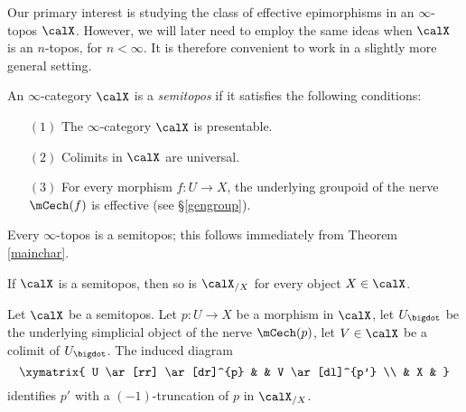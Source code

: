 Our primary interest is studying the class of effective epimorphisms in an $\infty$-topos $\calX$.
However, we will later need to employ the same ideas when $\calX$ is an $n$-topos, for $n < \infty$. It is therefore convenient to work in a slightly more general setting.

\begin{definition}
An $\infty$-category $\calX$ is a {\it semitopos} if it satisfies the following conditions:
\begin{itemize}
\item[$(1)$] The $\infty$-category $\calX$ is presentable.
\item[$(2)$] Colimits in $\calX$ are universal.
\item[$(3)$] For every morphism $f: U \rightarrow X$, the underlying groupoid
of the \Cech nerve $\mCech(f)$ is effective (see \S \ref{gengroup}). 
\end{itemize}
\end{definition}

\begin{remark}
Every $\infty$-topos is a semitopos; this follows immediately from Theorem \ref{mainchar}.
\end{remark}

\begin{remark}
If $\calX$ is a semitopos, then so is $\calX_{/X}$ for every object $X \in \calX$.
\end{remark}

\begin{proposition}\label{slurpme}
Let $\calX$ be a semitopos. Let $p: U \rightarrow X$ be a morphism
in $\calX$, let $U_{\bigdot}$ be the underlying simplicial object of the \Cech nerve $\mCech(p)$, let
$V \in \calX$ be a colimit of $U_{\bigdot}$. The induced diagram
$$ \xymatrix{ U \ar[rr] \ar[dr]^{p} & & V \ar[dl]^{p'} \\
& X & }$$
identifies $p'$ with a $(-1)$-truncation of $p$ in $\calX_{/X}$.
\end{proposition}

